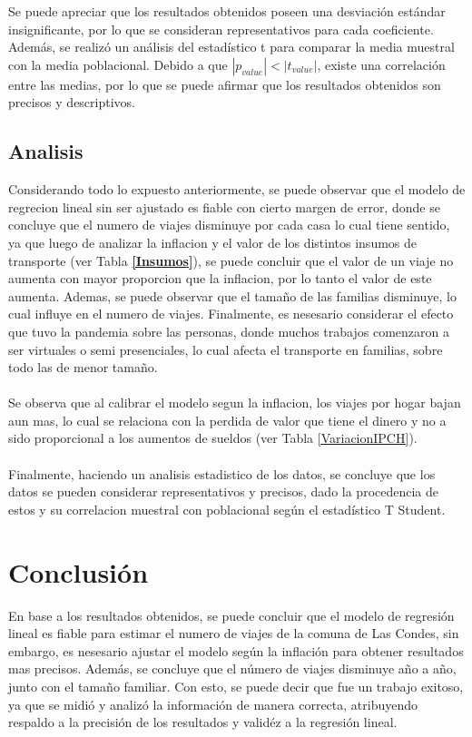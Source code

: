 \documentclass[12pt]{article} %
\begin{document}
Se puede apreciar que los resultados obtenidos poseen una desviación estándar insignificante, por lo que se 
consideran representativos para cada coeficiente. Además, se realizó un análisis del estadístico t para 
comparar la media muestral con la media poblacional. Debido a que \(\left| p_{value} \right| < \left| t_{value} \right|\), existe una correlación entre las medias, 
por lo que se puede afirmar que los resultados obtenidos son precisos y descriptivos.

\subsection{Analisis}

Considerando todo lo expuesto anteriormente, se puede observar que el modelo de regrecion lineal sin ser ajustado es fiable con cierto margen de error, donde se concluye que el numero de viajes disminuye por cada casa lo cual tiene sentido, ya que luego de analizar la inflacion y el valor de los distintos insumos de transporte (ver Tabla \textbf{\ref{Insumos}}), se puede concluir que el valor de un viaje no aumenta con mayor proporcion que la inflacion, por lo tanto el valor de este aumenta. Ademas, se puede observar que el tamaño de las familias disminuye, lo cual influye en el numero de viajes. Finalmente, es nesesario considerar el efecto que tuvo la pandemia sobre las personas, donde muchos trabajos comenzaron a ser virtuales o semi presenciales, lo cual afecta el transporte en familias, sobre todo las de menor tamaño.
\\ \\
Se observa que al calibrar el modelo segun la inflacion, los viajes por hogar bajan aun mas, lo cual se relaciona con la perdida de valor que tiene el dinero y no a sido proporcional a los aumentos de sueldos (ver Tabla \ref{VariacionIPCH}).
\\ \\
Finalmente, haciendo un analisis estadistico de los datos, se concluye que los datos se pueden considerar representativos y precisos, dado la procedencia de estos y su correlacion muestral con poblacional según el estadístico T Student.

\section{Conclusión}

En base a los resultados obtenidos, se puede concluir que el modelo 
de regresión lineal es fiable para estimar el numero de viajes de la 
comuna de Las Condes, sin embargo, es nesesario ajustar el modelo según 
la inflación para obtener resultados mas precisos. Además, se concluye 
que el número de viajes disminuye año a año, junto con el tamaño familiar. 
Con esto, se puede decir que fue un trabajo exitoso, ya que se midió y 
analizó la información de manera correcta, atribuyendo respaldo a la precisión 
de los resultados y validéz a la regresión lineal.
\end{document}
